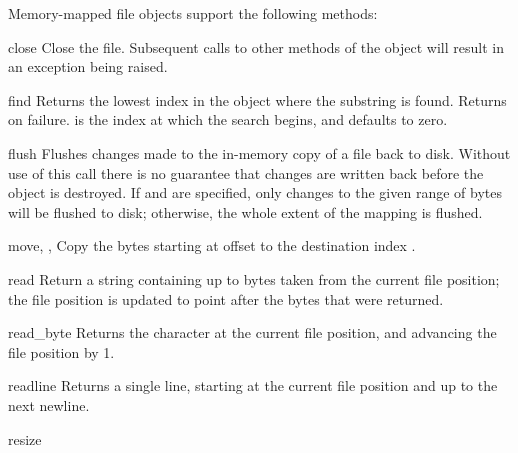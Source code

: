 Memory-mapped file objects support the following methods:


\begin{methoddesc}{close}{}
Close the file.  Subsequent calls to other methods of the object
will result in an exception being raised.
\end{methoddesc}

\begin{methoddesc}{find}{ }
  Returns the lowest index in the object where the substring  is
  found.  Returns  on failure.
   is the index at which the search begins, and defaults to zero.
\end{methoddesc}

\begin{methoddesc}{flush}{}
Flushes changes made to the in-memory copy of a file back to disk.
Without use of this call there is no guarantee that changes are
written back before the object is destroyed.  If  
and  are specified, only changes to the given range of bytes will be flushed to disk; otherwise, the whole extent of the mapping is flushed.
\end{methoddesc}

\begin{methoddesc}{move}{, , }
Copy the  bytes starting at offset  
to the destination index .
\end{methoddesc}

\begin{methoddesc}{read}{}
Return a string containing up to  bytes taken from the
current file position; the file position is updated to point after the
bytes that were returned. 
\end{methoddesc}

\begin{methoddesc}{read_byte}{}
Returns the character at the current file position, and advancing 
the file position by 1.
\end{methoddesc}

\begin{methoddesc}{readline}{}
Returns a single line, starting at the current file position and up to 
the next newline.
\end{methoddesc}

\begin{methoddesc}{resize}{}
\end{methoddesc}

